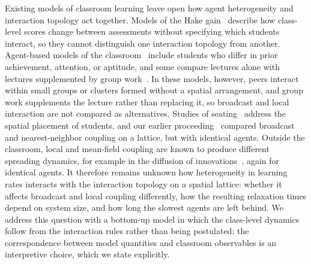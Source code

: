 \documentclass[a4paper,fleqn]{cas-sc}
\begin{document}
Existing models of classroom learning leave open how agent heterogeneity and interaction topology act together.
Models of the Hake gain~\citep{hake1998, pritchard2008mathematical, nitta2019mathematical} describe how class-level scores change between assessments without specifying which students interact, so they cannot distinguish one interaction topology from another.
Agent-based models of the classroom~\citep{bordogna2001theoretical, bordogna2003simulation, ormazabal2021agent, velasquez2021knowledge} include students who differ in prior achievement, attention, or aptitude, and some compare lectures alone with lectures supplemented by group work~\citep{bordogna2001theoretical, ormazabal2021agent}.
In these models, however, peers interact within small groups or clusters formed without a spatial arrangement, and group work supplements the lecture rather than replacing it, so broadcast and local interaction are not compared as alternatives.
Studies of seating~\citep{roxas2010seating, monterola2009} address the spatial placement of students, and our earlier proceeding~\citep{SelfSPP} compared broadcast and nearest-neighbor coupling on a lattice, but with identical agents.
Outside the classroom, local and mean-field coupling are known to produce different spreading dynamics, for example in the diffusion of innovations~\citep{fuks1997cellular}, again for identical agents.
It therefore remains unknown how heterogeneity in learning rates interacts with the interaction topology on a spatial lattice: whether it affects broadcast and local coupling differently, how the resulting relaxation times depend on system size, and how long the slowest agents are left behind.
We address this question with a bottom-up model in which the class-level dynamics follow from the interaction rules rather than being postulated; the correspondence between model quantities and classroom observables is an interpretive choice, which we state explicitly.
\end{document}
